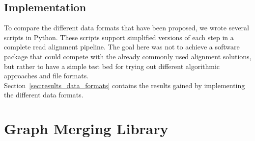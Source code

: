 \documentclass[a4paper,12pt,twoside,BCOR=10mm]{scrbook}
\begin{document}
\subsection{Implementation}
%

To compare the different data formats that have been proposed,
we wrote several scripts in Python.
These scripts support simplified versions of each step in a complete read alignment pipeline.
The goal here was not to achieve a software package that could compete with
the already commonly used alignment solutions, but rather to have a
simple test bed for trying out different algorithmic approaches and file formats. \\
Section~\ref{sec:results_data_formats} contains the results gained by
implementing the different data formats.

\section{Graph Merging Library}
%
\end{document}
